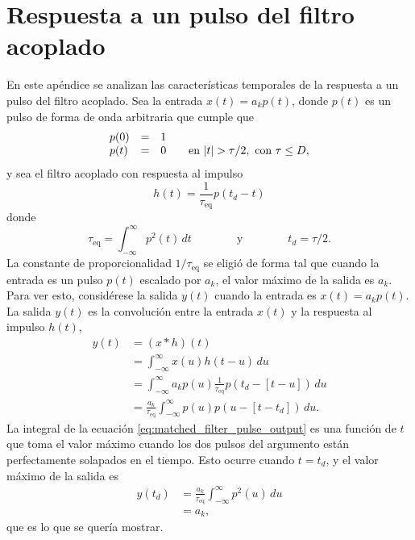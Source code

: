 \documentclass[a4paper]{article}
\begin{document}
\section{Respuesta a un pulso del filtro acoplado}\label{ap:matched_filter_pulse_response_derivation}

En este apéndice se analizan las características temporales de la respuesta a un pulso del filtro acoplado. Sea la entrada \(x(t)=a_kp(t)\), donde \(p(t)\) es un pulso de forma de onda arbitraria que cumple que
\[
\begin{array}{l l l l}
    p(0) & = & 1 &  \\
    p(t) & = & 0 & \quad\textrm{en } |t|>\tau/2,\textrm{ con }\tau\leq D,
\end{array}
\]
y sea el filtro acoplado con respuesta al impulso
\[
 h(t)=\frac{1}{\tau_\textrm{eq}}p(t_d-t)
\]
donde
\[
 \tau_\textrm{eq}=\int_{-\infty}^{\infty}p^2(t)\,dt\qquad\qquad\textrm{y}\qquad\qquad t_d=\tau/2.
\]
La constante de proporcionalidad \(1/\tau_\textrm{eq}\) se eligió de forma tal que cuando la entrada es un pulso \(p(t)\) escalado por \(a_k\), el valor máximo de la salida es \(a_k\).
Para ver esto, considérese la salida \(y(t)\) cuando la entrada es \(x(t)=a_kp(t)\). La salida \(y(t)\) es la convolución entre la entrada \(x(t)\) y la respuesta al impulso \(h(t)\),
\begin{align}\label{eq:matched_filter_pulse_output}
 y(t)&=\left(x*h\right)(t)\nonumber \\
     &=\int_{-\infty}^{\infty}x(u)h(t-u)\,du\nonumber\\
     &=\int_{-\infty}^{\infty}a_kp(u)\frac{1}{\tau_\textrm{eq}}p(t_d-\left[t-u\right])\,du\nonumber\\
     &=\frac{a_k}{\tau_\textrm{eq}}\int_{-\infty}^{\infty}p(u)p(u-\left[t-t_d\right])\,du.
\end{align}
La integral de la ecuación \ref{eq:matched_filter_pulse_output} es una función de \(t\) que toma el valor máximo cuando los dos pulsos del argumento están perfectamente solapados en el tiempo. Esto ocurre cuando \(t=t_d\), y el valor máximo de la salida es
\begin{align*}
 y(t_d)&=\frac{a_k}{\tau_\textrm{eq}}\int_{-\infty}^{\infty}p^2(u)\,du\\
       &=a_k,
\end{align*}
que es lo que se quería mostrar.
\end{document}
